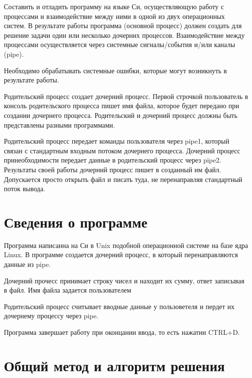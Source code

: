 \documentclass[pdf, unicode, 12pt, a4paper,oneside,fleqn]{article}
\begin{document}
Составить и отладить программу на языке Си, осуществляющую работу с процессами и
взаимодействие между ними в одной из двух операционных систем. В результате работы
программа (основной процесс) должен создать для решение задачи один или несколько
дочерних процессов. Взаимодействие между процессами осуществляется через системные
сигналы/события и/или каналы (pipe).

Необходимо обрабатывать системные ошибки, которые могут возникнуть в результате работы.

Родительский процесс создает дочерний процесс. Первой строчкой пользователь в консоль
родительского процесса пишет имя файла, которое будет передано при создании дочернего
процесса. Родительский и дочерний процесс должны быть представлены разными программами.

Родительский процесс передает команды пользователя через pipe1, который связан с
стандартным входным потоком дочернего процесса. Дочерний процесс принеобходимости
передает данные в родительский процесс через pipe2. Результаты своей работы дочерний
процесс пишет в созданный им файл. Допускается просто открыть файл и писать туда, не
перенаправляя стандартный поток вывода.

\section{Сведения о программе}

Программа написанна на Си в Unix подобной операционной системе на базе ядра Linux.
В программе создается дочерний процесс, в который перенаправляются данные из pipe.

Дочерний прочесс принимает строку чисел и находит их сумму, ответ записывая в файл. Имя файла задается пользователем

Родительский процесс считывает вводные данные у пользоветеля и пердет их дочернему процессу через pipe.

Программа завершает работу при оконцании ввода, то есть нажатии CTRL+D.

\section{Общий метод и алгоритм решения}
\end{document}
